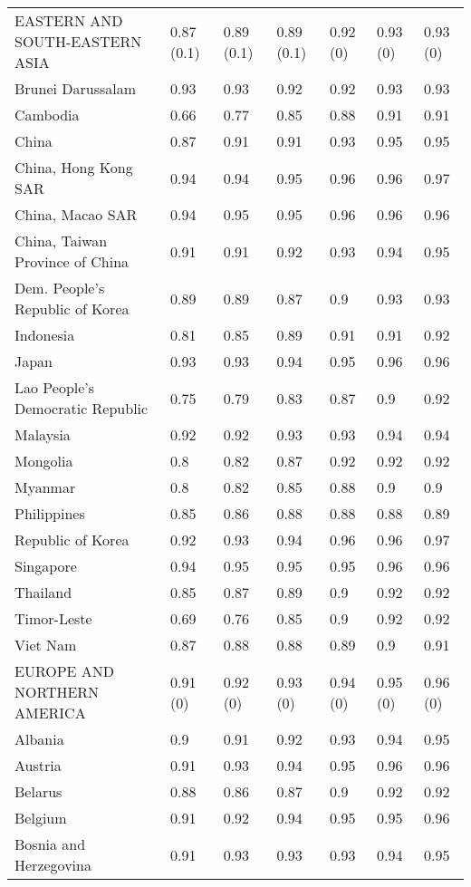 \begin{longtable}[t]{lllllll}
EASTERN AND SOUTH-EASTERN ASIA & 0.87 (0.1) & 0.89 (0.1) & 0.89 (0.1) & 0.92 (0) & 0.93 (0) & 0.93 (0)\\
Brunei Darussalam & 0.93 & 0.93 & 0.92 & 0.92 & 0.93 & 0.93\\
Cambodia & 0.66 & 0.77 & 0.85 & 0.88 & 0.91 & 0.91\\
China & 0.87 & 0.91 & 0.91 & 0.93 & 0.95 & 0.95\\
China, Hong Kong SAR & 0.94 & 0.94 & 0.95 & 0.96 & 0.96 & 0.97\\
China, Macao SAR & 0.94 & 0.95 & 0.95 & 0.96 & 0.96 & 0.96\\
China, Taiwan Province of China & 0.91 & 0.91 & 0.92 & 0.93 & 0.94 & 0.95\\
Dem. People's Republic of Korea & 0.89 & 0.89 & 0.87 & 0.9 & 0.93 & 0.93\\
Indonesia & 0.81 & 0.85 & 0.89 & 0.91 & 0.91 & 0.92\\
Japan & 0.93 & 0.93 & 0.94 & 0.95 & 0.96 & 0.96\\
Lao People's Democratic Republic & 0.75 & 0.79 & 0.83 & 0.87 & 0.9 & 0.92\\
Malaysia & 0.92 & 0.92 & 0.93 & 0.93 & 0.94 & 0.94\\
Mongolia & 0.8 & 0.82 & 0.87 & 0.92 & 0.92 & 0.92\\
Myanmar & 0.8 & 0.82 & 0.85 & 0.88 & 0.9 & 0.9\\
Philippines & 0.85 & 0.86 & 0.88 & 0.88 & 0.88 & 0.89\\
Republic of Korea & 0.92 & 0.93 & 0.94 & 0.96 & 0.96 & 0.97\\
Singapore & 0.94 & 0.95 & 0.95 & 0.95 & 0.96 & 0.96\\
Thailand & 0.85 & 0.87 & 0.89 & 0.9 & 0.92 & 0.92\\
Timor-Leste & 0.69 & 0.76 & 0.85 & 0.9 & 0.92 & 0.92\\
Viet Nam & 0.87 & 0.88 & 0.88 & 0.89 & 0.9 & 0.91\\
EUROPE AND NORTHERN AMERICA & 0.91 (0) & 0.92 (0) & 0.93 (0) & 0.94 (0) & 0.95 (0) & 0.96 (0)\\
Albania & 0.9 & 0.91 & 0.92 & 0.93 & 0.94 & 0.95\\
Austria & 0.91 & 0.93 & 0.94 & 0.95 & 0.96 & 0.96\\
Belarus & 0.88 & 0.86 & 0.87 & 0.9 & 0.92 & 0.92\\
Belgium & 0.91 & 0.92 & 0.94 & 0.95 & 0.95 & 0.96\\
Bosnia and Herzegovina & 0.91 & 0.93 & 0.93 & 0.93 & 0.94 & 0.95\\

\end{longtable}
